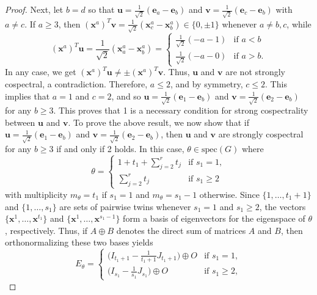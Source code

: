 \documentclass[preprint]{elsarticle}
\newcommand\spec{{\mathrm{spec}}}
\begin{document}
\begin{proof}
Next, let $b=d$ so that $\mathbf{u}=\frac{1}{\sqrt2}(\mathbf{e}_a-\mathbf{e}_b)$ and $\mathbf{v}=\frac{1}{\sqrt2}(\mathbf{e}_c-\mathbf{e}_b)$ with $a\neq c$. %
If $a\geq 3$, then $(\mathbf{x}^{a})^T\mathbf{v}= \frac{1}{\sqrt{2}}(\mathbf{x}^{a}_c-\mathbf{x}^{a}_b)\in\{0,\pm 1\}$ whenever $a\neq b,c$, while
\[
  (\mathbf{x}^{a})^T\mathbf{u}= \frac{1}{\sqrt{2}}(\mathbf{x}^{a}_a-\mathbf{x}^{a}_b)=
  \begin{cases}
    \frac{1}{\sqrt{2}}(-a-1) & \text{if $a<b$}\\
    \frac{1}{\sqrt2}(-a-0) & \text{if $a>b$}.
  \end{cases}
\]
In any case, we get $(\mathbf{x}^{a})^T\mathbf{u}\neq\pm (\mathbf{x}^{a})^T\mathbf{v}$. Thus, $\mathbf{u}$ and $\mathbf{v}$ are not strongly cospectral, a contradiction. Therefore, $a\leq 2$, and by symmetry, $c\leq 2$. This implies that $a=1$ and $c=2$, and so $\mathbf{u}=\frac{1}{\sqrt2}(\mathbf{e}_1-\mathbf{e}_b)$ and $\mathbf{v}=\frac{1}{\sqrt2}(\mathbf{e}_2-\mathbf{e}_b)$ for any $b\geq 3$. This proves that 1 is a necessary condition for strong cospectrality between $\mathbf{u}$ and $\mathbf{v}$. To prove the above result, we now show that if $\mathbf{u}=\frac{1}{\sqrt2}(\mathbf{e}_1-\mathbf{e}_b)$ and $\mathbf{v}=\frac{1}{\sqrt2}(\mathbf{e}_2-\mathbf{e}_b)$, then $\mathbf{u}$ and $\mathbf{v}$ are strongly cospectral for any $b\geq 3$ if and only if 2 holds. In this case, $\theta\in\spec(G)$ where
\[
  \theta=
  \begin{cases}
    1+t_1+\sum_{j=2}^rt_j & \text{if $s_1=1$},\\
    \sum_{j=2}^rt_j & \text{if $s_1\geq 2$}
  \end{cases}
\]
with multiplicity $m_\theta=t_1$ if $s_1=1$ and $m_\theta=s_1-1$ otherwise. Since $\{1,\ldots,t_1+1\}$ and $\{1,\ldots,s_1\}$ are sets of pairwise twins whenever $s_1=1$ and $s_1\geq 2$, the vectors $\{\mathbf{x}^{1},\ldots,\mathbf{x}^{t_1}\}$ and $\{\mathbf{x}^{1},\ldots,\mathbf{x}^{s_1-1}\}$ form a basis of eigenvectors for the eigenspace of $\theta$, respectively. Thus, if $A\oplus B$ denotes the direct sum of matrices $A$ and $B$, then orthonormalizing these two bases yields
\[
  E_\theta=
  \begin{cases}
    \big(I_{t_1+1}-\frac{1}{t_1+1}J_{t_1+1}\big)\oplus O & \text{if $s_1=1$},\\
    \big(I_{s_1}-\frac{1}{s_1}J_{s_1}\big)\oplus O & \text{if $s_1\geq 2$},
  \end{cases}
\]
\end{proof}
\end{document}
